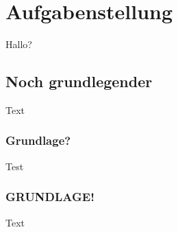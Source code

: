 \section{Aufgabenstellung}
\label{sec:aufgabenstellung}

Hallo?

\subsection{Noch grundlegender}
Text

\subsubsection{Grundlage?}
Test

\subsubsection{GRUNDLAGE!}
Text
